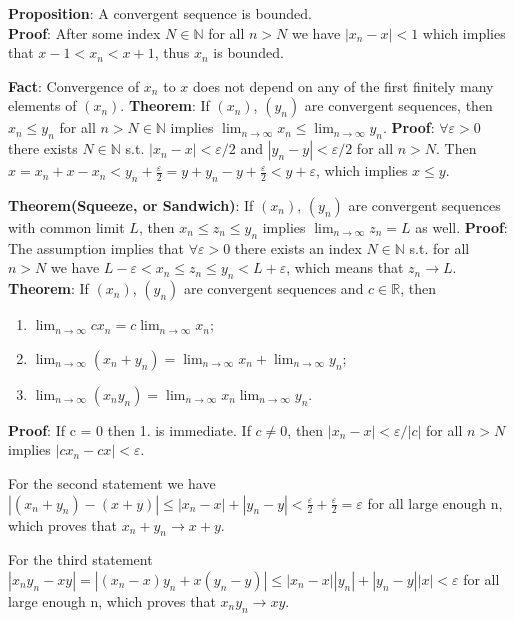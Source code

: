 \documentclass{article}
\begin{document}
\textbf{Proposition}: A convergent sequence is bounded.\\
\textbf{Proof}: After some index $N \in \mathbb{N}$ for all $n > N$ we have $|x_n - x| < 1$ which implies that $x - 1 < x_n < x + 1$, thus $x_n$ is bounded.

\textbf{Fact}: Convergence of $x_n$ to $x$ does not depend on any of the first finitely many elements of $(x_n)$. 
\textbf{Theorem}: If $(x_n)$, $(y_n)$ are convergent sequences, then $x_n \leq y_n$ for all $n > N \in \mathbb{N}$ implies $\lim_{n\to\infty} x_n \leq \lim_{n\to\infty} y_n$. \textbf{Proof}: $\forall \varepsilon > 0$ there exists $N \in \mathbb{N}$ s.t. $|x_n - x| < \varepsilon/2$ and $|y_n - y| < \varepsilon/2$ for all $n > N$. Then $x = x_n + x - x_n < y_n + \frac{\varepsilon}{2} = y + y_n - y + \frac{\varepsilon}{2} < y + \varepsilon$, which implies $x \leq y$.

\textbf{Theorem(Squeeze, or Sandwich)}: If $(x_n)$, $(y_n)$ are convergent sequences with common limit $L$, then $x_n \leq z_n \leq y_n$ implies $\displaystyle \lim_{n\to\infty} z_n = L$ as well. \textbf{Proof}: The assumption implies that $\forall \varepsilon > 0$ there exists an index $N \in \mathbb{N}$ s.t. for all $n > N$ we have $L - \varepsilon < x_n \leq z_n \leq y_n < L + \varepsilon$, which means that $z_n \to L$. \textbf{Theorem}: If $(x_n)$, $(y_n)$ are convergent sequences and $c \in \mathbb{R}$, then
\begin{enumerate}
    \item $\displaystyle \lim_{n\to\infty} cx_n = c \lim_{n\to\infty} x_n$; 
    \item $\displaystyle \lim_{n\to\infty} (x_n + y_n) = \lim_{n\to\infty} x_n + \lim_{n\to\infty} y_n$; 
    \item$\displaystyle \lim_{n\to\infty} (x_n y_n) = \lim_{n\to\infty} x_n \lim_{n\to\infty} y_n$.
\end{enumerate}
\textbf{Proof}: If c = 0 then 1. is immediate. If $c \neq 0$, then $|x_n - x| < \varepsilon/|c|$ for all $n > N$ implies $|cx_n - cx| < \varepsilon$.

For the second statement we have $|(x_n + y_n) - (x + y)| \leq |x_n - x| + |y_n - y| < \frac{\varepsilon}{2} + \frac{\varepsilon}{2} = \varepsilon$ for all large enough n, which proves that $x_n + y_n \to x + y$.

For the third statement $|x_n y_n - xy| = |(x_n - x)y_n + x(y_n - y)| \leq |x_n - x||y_n| + |y_n - y||x| < \varepsilon$ for all large enough n, which proves that $x_n y_n \to xy$.
\end{document}
